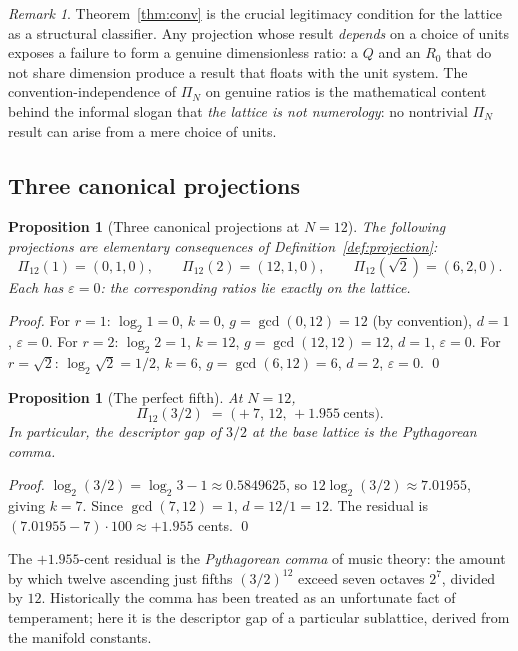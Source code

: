 \documentclass[11pt,a4paper]{article}
\newtheorem{proposition}[theorem]{Proposition}
\theoremstyle{definition}
\theoremstyle{remark}
\newtheorem{remark}[theorem]{Remark}
\newcommand{\eps}{\varepsilon}
\begin{document}
\begin{remark}
Theorem~\ref{thm:conv} is the crucial legitimacy condition for the lattice as a structural classifier. Any projection whose result \emph{depends} on a choice of units exposes a failure to form a genuine dimensionless ratio: a $Q$ and an $R_{0}$ that do not share dimension produce a result that floats with the unit system. The convention-independence of $\Pi_{N}$ on genuine ratios is the mathematical content behind the informal slogan that \emph{the lattice is not numerology}: no nontrivial $\Pi_{N}$ result can arise from a mere choice of units.
\end{remark}

\subsection{Three canonical projections}

\begin{proposition}[Three canonical projections at $N=12$]\label{prop:canonical}
The following projections are elementary consequences of Definition~\ref{def:projection}:
\[
\Pi_{12}(1) = (0,1,0), \qquad \Pi_{12}(2) = (12,1,0), \qquad \Pi_{12}(\sqrt{2}) = (6,2,0).
\]
Each has $\eps=0$: the corresponding ratios lie exactly on the lattice.
\end{proposition}

\begin{proof}
For $r=1$: $\log_{2}1 = 0$, $k=0$, $g=\gcd(0,12)=12$ (by convention), $d=1$, $\eps=0$. For $r=2$: $\log_{2}2 = 1$, $k=12$, $g=\gcd(12,12)=12$, $d=1$, $\eps=0$. For $r=\sqrt{2}$: $\log_{2}\sqrt{2}=1/2$, $k=6$, $g=\gcd(6,12)=6$, $d=2$, $\eps=0$. \qed
\end{proof}

\begin{proposition}[The perfect fifth]\label{prop:fifth}
At $N=12$,
\[
\Pi_{12}(3/2) \;=\; \bigl(+7,\,12,\,+1.955\ \text{cents}\bigr).
\]
In particular, the descriptor gap of $3/2$ at the base lattice is the Pythagorean comma.
\end{proposition}

\begin{proof}
$\log_{2}(3/2) = \log_{2}3 - 1 \approx 0.5849625$, so $12\log_{2}(3/2) \approx 7.01955$, giving $k=7$. Since $\gcd(7,12)=1$, $d=12/1=12$. The residual is $(7.01955 - 7)\cdot 100 \approx +1.955$ cents. \qed
\end{proof}

The $+1.955$-cent residual is the \emph{Pythagorean comma} of music theory: the amount by which twelve ascending just fifths $(3/2)^{12}$ exceed seven octaves $2^{7}$, divided by $12$. Historically the comma has been treated as an unfortunate fact of temperament; here it is the descriptor gap of a particular sublattice, derived from the manifold constants.
\end{document}
